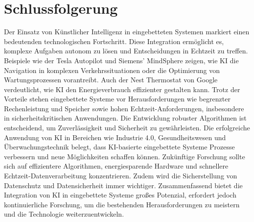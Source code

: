 \chapter{Schlussfolgerung}

Der Einsatz von Künstlicher Intelligenz in eingebetteten Systemen markiert einen bedeutenden technologischen Fortschritt. Diese Integration ermöglicht es, komplexe Aufgaben autonom zu lösen und Entscheidungen in Echtzeit zu treffen. Beispiele wie der Tesla Autopilot und Siemens' MindSphere zeigen, wie KI die Navigation in komplexen Verkehrssituationen oder die Optimierung von Wartungsprozessen vorantreibt. Auch der Nest Thermostat von Google verdeutlicht, wie KI den Energieverbrauch effizienter gestalten kann.
Trotz der Vorteile stehen eingebettete Systeme vor Herausforderungen wie begrenzter Rechenleistung und Speicher sowie hohen Echtzeit-Anforderungen, insbesondere in sicherheitskritischen Anwendungen. Die Entwicklung robuster Algorithmen ist entscheidend, um Zuverlässigkeit und Sicherheit zu gewährleisten.
Die erfolgreiche Anwendung von KI in Bereichen wie Industrie 4.0, Gesundheitswesen und Überwachungstechnik belegt, dass KI-basierte eingebettete Systeme Prozesse verbessern und neue Möglichkeiten schaffen können. Zukünftige Forschung sollte sich auf effizientere Algorithmen, energiesparende Hardware und schnellere Echtzeit-Datenverarbeitung konzentrieren. Zudem wird die Sicherstellung von Datenschutz und Datensicherheit immer wichtiger.
Zusammenfassend bietet die Integration von KI in eingebettete Systeme großes Potenzial, erfordert jedoch kontinuierliche Forschung, um die bestehenden Herausforderungen zu meistern und die Technologie weiterzuentwickeln.
